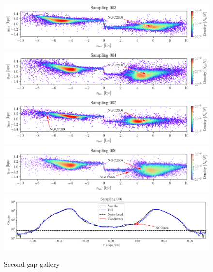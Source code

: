 \documentclass[draft]{aa}
\begin{document}
\begin{appendix}
    \begin{figure}
      \centering
      \includegraphics[width=\linewidth]{gallery_of_gaps_monte-carlo-003.png}      
      \includegraphics[width=\linewidth]{gallery_of_gaps_monte-carlo-004.png}
      \includegraphics[width=\linewidth]{gallery_of_gaps_monte-carlo-005.png}
      \includegraphics[width=\linewidth]{gallery_of_gaps_monte-carlo-006.png}
      \includegraphics[width=\linewidth]{tau-profile-monte-carlo-006.png}
      \caption{Second gap gallery}
      \label{fig:gallery1}
      \end{figure}        



\end{appendix}
\end{document}
